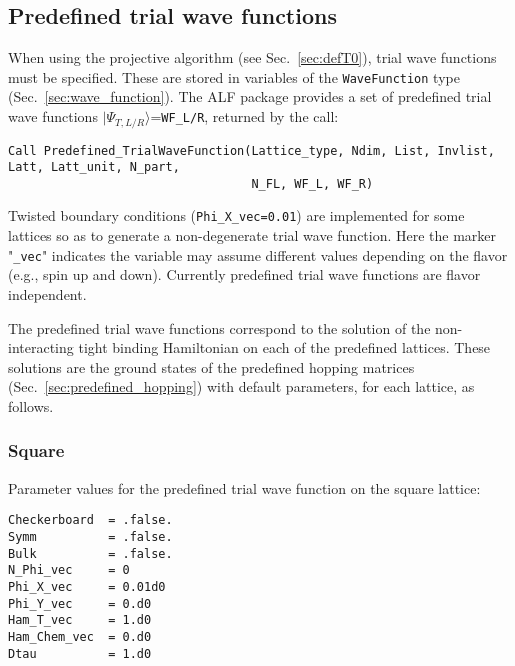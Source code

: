 

\subsection{Predefined trial wave functions} \label{sec:predefined_trial_wave_function}

When using the projective algorithm (see Sec.~\ref{sec:defT0}), trial wave functions must be specified.
These are stored in variables of the \texttt{WaveFunction} type (Sec.~\ref{sec:wave_function}).
The ALF package provides a set of predefined trial wave functions $|\Psi_{T,L/R}\rangle$=\texttt{WF\_L/R}, returned by the call:

\begin{lstlisting}[style=fortran]
Call Predefined_TrialWaveFunction(Lattice_type, Ndim, List, Invlist, Latt, Latt_unit, N_part,
                                  N_FL, WF_L, WF_R)
\end{lstlisting}
Twisted boundary conditions (\texttt{Phi\_X\_vec=0.01}) are implemented for some lattices so as to generate a non-degenerate trial wave function. Here the marker "\texttt{\_vec}" indicates the variable may assume different values depending on the flavor (e.g., spin up and down). Currently predefined trial wave functions are flavor independent.

The predefined trial wave functions correspond to the solution of the non-interacting tight binding Hamiltonian on each of the predefined lattices. These solutions are the ground states of the predefined hopping matrices (Sec.~\ref{sec:predefined_hopping}) with default parameters, for each lattice, as follows.

\subsubsection{Square}

Parameter values for the predefined trial wave function on the square lattice:
\begin{lstlisting}[style=fortran]
Checkerboard  = .false.
Symm          = .false.
Bulk          = .false.
N_Phi_vec     = 0
Phi_X_vec     = 0.01d0
Phi_Y_vec     = 0.d0
Ham_T_vec     = 1.d0
Ham_Chem_vec  = 0.d0
Dtau          = 1.d0
\end{lstlisting}


